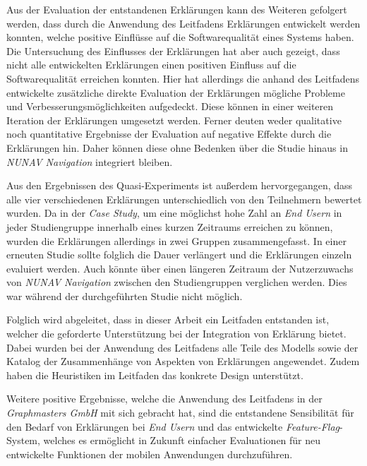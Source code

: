 Aus der Evaluation der entstandenen Erklärungen kann des Weiteren gefolgert werden, dass durch die Anwendung des Leitfadens Erklärungen entwickelt werden konnten, welche positive Einflüsse auf die Softwarequalität eines Systems haben. Die Untersuchung des Einflusses der Erklärungen hat aber auch gezeigt, dass nicht alle entwickelten Erklärungen einen positiven Einfluss auf die Softwarequalität erreichen konnten. Hier hat allerdings die anhand des Leitfadens entwickelte zusätzliche direkte Evaluation der Erklärungen mögliche Probleme und Verbesserungsmöglichkeiten aufgedeckt. Diese können in einer weiteren Iteration der Erklärungen umgesetzt werden. Ferner deuten weder qualitative noch quantitative Ergebnisse der Evaluation auf negative Effekte durch die Erklärungen hin. Daher können diese ohne Bedenken über die Studie hinaus in \textit{NUNAV Navigation} integriert bleiben.

Aus den Ergebnissen des Quasi-Experiments ist außerdem hervorgegangen, dass alle vier verschiedenen Erklärungen unterschiedlich von den Teilnehmern bewertet wurden. Da in der \textit{Case Study}, um eine möglichst hohe Zahl an \textit{End Usern} in jeder Studiengruppe innerhalb eines kurzen Zeitraums erreichen zu können, wurden die Erklärungen allerdings in zwei Gruppen zusammengefasst. In einer erneuten Studie sollte folglich die Dauer verlängert und die Erklärungen einzeln evaluiert werden. Auch könnte über einen längeren Zeitraum der Nutzerzuwachs von \textit{NUNAV Navigation} zwischen den Studiengruppen verglichen werden. Dies war während der durchgeführten Studie nicht möglich.

Folglich wird abgeleitet, dass in dieser Arbeit ein Leitfaden entstanden ist, welcher die geforderte Unterstützung bei der Integration von Erklärung bietet. Dabei wurden bei der Anwendung des Leitfadens alle Teile des Modells sowie der Katalog der Zusammenhänge von Aspekten von Erklärungen angewendet. Zudem haben die Heuristiken im Leitfaden das konkrete Design unterstützt.

Weitere positive Ergebnisse, welche die Anwendung des Leitfadens in der \textit{Graphmasters GmbH} mit sich gebracht hat, sind die entstandene Sensibilität für den Bedarf von Erklärungen bei \textit{End Usern} und das entwickelte \textit{Feature-Flag}-System, welches es ermöglicht in Zukunft einfacher Evaluationen für neu entwickelte Funktionen der mobilen Anwendungen durchzuführen.